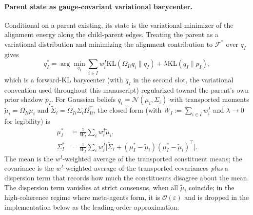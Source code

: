 \documentclass[11pt]{article}
\begin{document}
\paragraph{Parent state as gauge-covariant variational barycenter.} Conditional on a parent existing, its state is the variational minimizer of the alignment energy along the child-parent edges. Treating the parent as a variational distribution and minimizing the alignment contribution to $\mathcal{F}^*$ over $q_I$ gives
\begin{equation}
q_I^* = \arg\min_{q_I} \sum_{i \in I} w_i^I \mathrm{KL}(\Omega_{Ii} q_i \| q_I) + \lambda \mathrm{KL}(q_I \| p_I),
\label{eq:meta_agent_barycenter}
\end{equation}
which is a forward-KL barycenter (with $q_I$ in the second slot, the variational convention used throughout this manuscript) regularized toward the parent's own prior shadow $p_I$. For Gaussian beliefs $q_i = \mathcal{N}(\mu_i, \Sigma_i)$ with transported moments $\tilde{\mu}_i = \Omega_{Ii}\mu_i$ and $\tilde{\Sigma}_i = \Omega_{Ii}\Sigma_i\Omega_{Ii}^\top$, the closed form (with $W_I := \sum_{i \in I} w_i^I$ and $\lambda \to 0$ for legibility) is
\begin{align}
\mu_I^* &= \tfrac{1}{W_I}\textstyle\sum_i w_i^I \tilde{\mu}_i,
\label{eq:meta_agent_mu_barycenter}
\\
\Sigma_I^* &= \tfrac{1}{W_I}\textstyle\sum_i w_i^I\big[\tilde{\Sigma}_i + (\mu_I^* - \tilde{\mu}_i)(\mu_I^* - \tilde{\mu}_i)^\top\big].
\label{eq:meta_agent_sigma_barycenter}
\end{align}
The mean is the $w^I$-weighted average of the transported constituent means; the covariance is the $w^I$-weighted average of the transported covariances \emph{plus} a dispersion term that records how much the constituents disagree about the mean. The dispersion term vanishes at strict consensus, when all $\tilde{\mu}_i$ coincide; in the high-coherence regime where meta-agents form, it is $\mathcal{O}(\varepsilon)$ and is dropped in the implementation below as the leading-order approximation.
\end{document}
